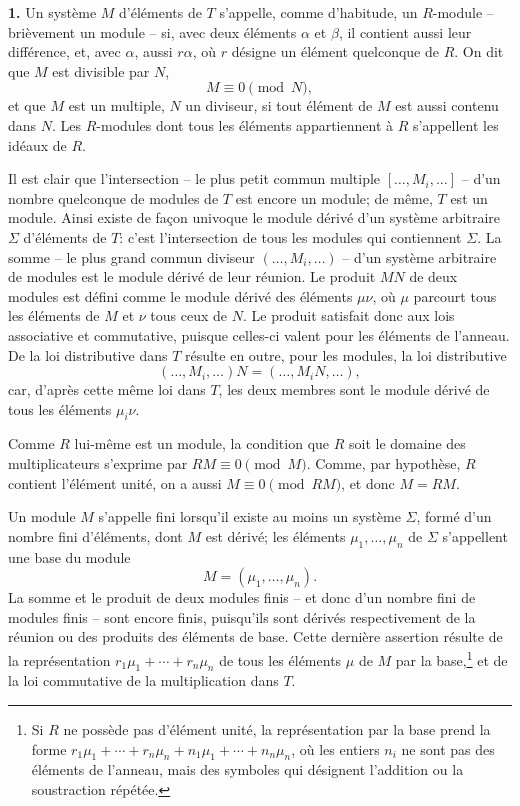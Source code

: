 \textbf{1.} Un système $M$ d'éléments de $T$ s'appelle, comme d'habitude, un $R$-module -- brièvement un module -- si, avec deux éléments $\alpha$ et $\beta$, il contient aussi leur différence, et, avec $\alpha$, aussi $r\alpha$, où $r$ désigne un élément quelconque de $R$. On dit que $M$ est divisible par $N$,
\[
        M\equiv 0 \pmod N,
\]
et que $M$ est un multiple, $N$ un diviseur, si tout élément de $M$ est aussi contenu dans $N$. Les $R$-modules dont tous les éléments appartiennent à $R$ s'appellent les idéaux de $R$.

Il est clair que l'intersection -- le plus petit commun multiple $[\ldots,M_i,\ldots]$ -- d'un nombre quelconque de modules de $T$ est encore un module; de même, $T$ est un module. Ainsi existe de façon univoque le module dérivé d'un système arbitraire $\Sigma$ d'éléments de $T$: c'est l'intersection de tous les modules qui contiennent $\Sigma$. La somme -- le plus grand commun diviseur $(\ldots,M_i,\ldots)$ -- d'un système arbitraire de modules est le module dérivé de leur réunion. Le produit $MN$ de deux modules est défini comme le module dérivé des éléments $\mu\nu$, où $\mu$ parcourt tous les éléments de $M$ et $\nu$ tous ceux de $N$. Le produit satisfait donc aux lois associative et commutative, puisque celles-ci valent pour les éléments de l'anneau. De la loi distributive dans $T$ résulte en outre, pour les modules, la loi distributive
\[
        (\ldots,M_i,\ldots)N=(\ldots,M_iN,\ldots),
\]
car, d'après cette même loi dans $T$, les deux membres sont le module dérivé de tous les éléments $\mu_i\nu$.

Comme $R$ lui-même est un module, la condition que $R$ soit le domaine des multiplicateurs s'exprime par $RM\equiv0\pmod M$. Comme, par hypothèse, $R$ contient l'élément unité, on a aussi $M\equiv0\pmod{RM}$, et donc $M=RM$.

Un module $M$ s'appelle fini lorsqu'il existe au moins un système $\Sigma$, formé d'un nombre fini d'éléments, dont $M$ est dérivé; les éléments $\mu_1,\ldots,\mu_n$ de $\Sigma$ s'appellent une base du module
\[
        M=(\mu_1,\ldots,\mu_n).
\]
La somme et le produit de deux modules finis -- et donc d'un nombre fini de modules finis -- sont encore finis, puisqu'ils sont dérivés respectivement de la réunion ou des produits des éléments de base. Cette dernière assertion résulte de la représentation $r_1\mu_1+\cdots+r_n\mu_n$ de tous les éléments $\mu$ de $M$ par la base,\footnote{Si $R$ ne possède pas d'élément unité, la représentation par la base prend la forme $r_1\mu_1+\cdots+r_n\mu_n+n_1\mu_1+\cdots+n_n\mu_n$, où les entiers $n_i$ ne sont pas des éléments de l'anneau, mais des symboles qui désignent l'addition ou la soustraction répétée.} et de la loi commutative de la multiplication dans $T$.

